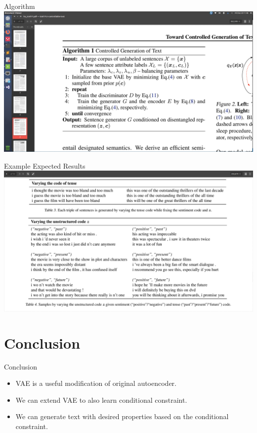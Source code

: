 \documentclass{beamer}
\begin{document}
    \begin{frame}{Algorithm}
        \includegraphics{algorithm}
    \end{frame}

    \begin{frame}{Example Expected Results}
        \includegraphics{example}
    \end{frame}

    \section{Conclusion}

    \begin{frame}{Conclusion}
        \begin{itemize}
            \item VAE is a useful modification of original autoencoder.
            \item We can extend VAE to also learn conditional constraint.
            \item We can generate text with desired properties based on the conditional constraint.
        \end{itemize}
    \end{frame}

    
\end{document}
